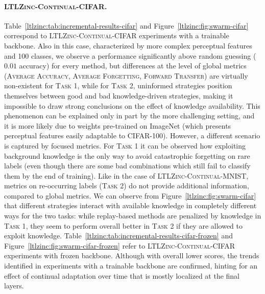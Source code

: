 \paragraph{\textsc{LTLZinc-Continual-CIFAR}.} Table~\ref{ltlzinc:tab:incremental-results-cifar} and Figure~\ref{ltlzinc:fig:swarm-cifar} correspond to \textsc{LTLZinc-Continual-CIFAR} experiments with a trainable backbone.
Also in this case, characterized by more complex perceptual features and 100 classes, we observe a performance significantly above random guessing ($0.01$ accuracy) for every method, but differences at the level of global metrics (\textsc{Average Accuracy}, \textsc{Average Forgetting}, \textsc{Forward Transfer}) are virtually non-existent for \textsc{Task 1}, while for \textsc{Task 2}, uninformed strategies position themselves between good and bad knowledge-driven strategies, making it impossible to draw strong conclusions on the effect of knowledge availability. This phenomenon can be explained only in part by the more challenging setting, and it is more likely due to weights pre-trained on ImageNet (which presents perceptual features easily adaptable to CIFAR-100). However, a different scenario is captured by focused metrics. For \textsc{Task 1} it can be observed how exploiting background knowledge is the only way to avoid catastrophic forgetting on rare labels (even though there are some bad combinations which still fail to classify them by the end of training).
Like in the case of \textsc{LTLZinc-Continual-MNIST}, metrics on re-occurring labels (\textsc{Task 2}) do not provide additional information, compared to global metrics.
We can observe from Figure~\ref{ltlzinc:fig:swarm-cifar} that different strategies interact with available knowledge in completely different ways for the two tasks: while replay-based methods are penalized by knowledge in \textsc{Task 1}, they seem to perform overall better in \textsc{Task 2} if they are allowed to exploit knowledge.
Table~\ref{ltlzinc:tab:incremental-results-cifar-frozen} and Figure~\ref{ltlzinc:fig:swarm-cifar-frozen} refer to \textsc{LTLZinc-Continual-CIFAR} experiments with frozen backbone. Although with overall lower scores, the trends identified in experiments with a trainable backbone are confirmed, hinting for an effect of continual adaptation over time that is mostly localized at the final layers.
